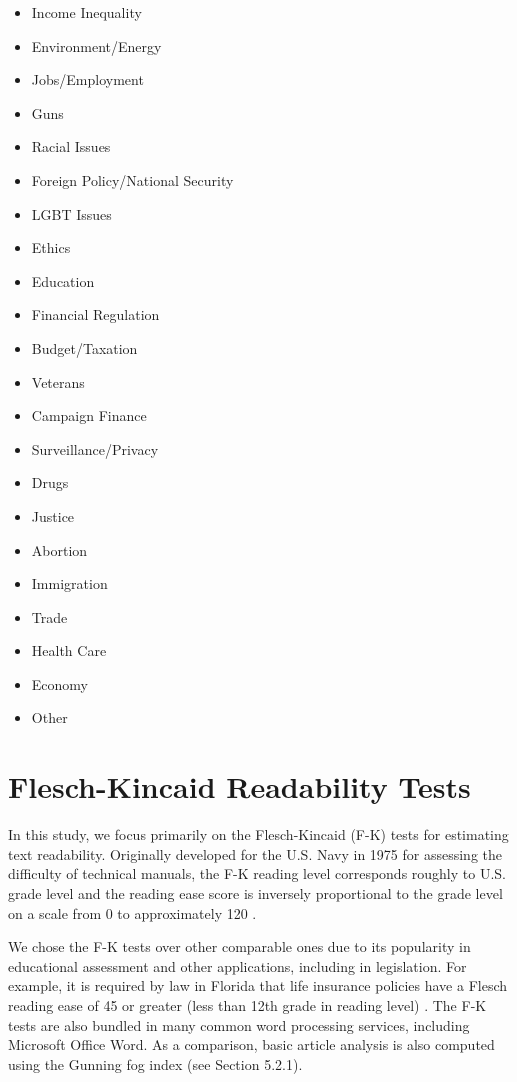 \begin{multicols}{2}
    \begin{itemize}
    \itemsep-1em 
      \item Income Inequality
      \item Environment/Energy
      \item Jobs/Employment
      \item Guns
      \item Racial Issues
      \item Foreign Policy/National Security
      \item LGBT Issues
      \item Ethics
      \item Education
      \item Financial Regulation
      \item Budget/Taxation
      \item Veterans
      \item Campaign Finance
      \item Surveillance/Privacy
      \item Drugs
      \item Justice
      \item Abortion
      \item Immigration
      \item Trade
      \item Health Care
      \item Economy
      \item Other 
    \end{itemize}
\end{multicols}
 


\section{Flesch-Kincaid Readability Tests} 
In this study, we focus primarily on the Flesch-Kincaid (F-K) tests for estimating text readability. Originally developed for the U.S. Navy in 1975 for assessing the difficulty of technical manuals, the F-K reading level corresponds roughly to U.S. grade level and the reading ease score is inversely proportional to the grade level on a scale from 0 to approximately 120 \cite{kincaid1975derivation}.

We chose the F-K tests over other comparable ones due to its popularity in educational assessment and other applications, including in legislation. For example, it is required by law in Florida that life insurance policies have a Flesch reading ease of 45 or greater (less than 12th grade in reading level) \cite{Statu37online}. The F-K tests are also bundled in many common word processing services, including Microsoft Office Word. As a comparison, basic article analysis is also computed using the Gunning fog index (see Section 5.2.1).

